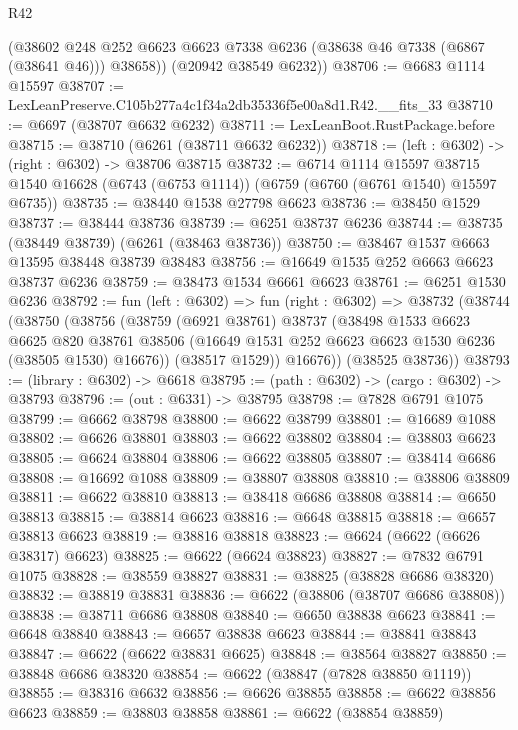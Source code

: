 \begin{lexlean}{R42}
\begin{coremodule}
{        (@38602 @248 @252 @6623 @6623 @7338 @6236 (@38638 @46 @7338 (@6867 (@38641 @46))) @38658))
      (@20942 @38549 @6232))
@38706 := @6683 @1114 @15597
@38707 := LexLeanPreserve.C105b277a4c1f34a2db35336f5e00a8d1.R42.__fits_33
@38710 := @6697 (@38707 @6632 @6232)
@38711 := LexLeanBoot.RustPackage.before
@38715 := @38710 (@6261 (@38711 @6632 @6232))
@38718 := (left : @6302) -> (right : @6302) -> @38706 @38715
@38732 := @6714
    @1114
    @15597
    @38715
    @1540
    @16628
    (@6743 (@6753 @1114))
    (@6759 (@6760 (@6761 @1540) @15597 @6735))
@38735 := @38440 @1538 @27798 @6623
@38736 := @38450 @1529
@38737 := @38444 @38736
@38739 := @6251 @38737 @6236
@38744 := @38735 (@38449 @38739) (@6261 (@38463 @38736))
@38750 := @38467 @1537 @6663 @13595 @38448 @38739 @38483
@38756 := @16649 @1535 @252 @6663 @6623 @38737 @6236
@38759 := @38473 @1534 @6661 @6623
@38761 := @6251 @1530 @6236
@38792 := fun (left : @6302) =>
  fun (right : @6302) =>
  @38732
    (@38744
      (@38750
        (@38756
          (@38759
            (@6921 @38761)
            @38737
            (@38498
              @1533
              @6623
              @6625
              @820
              @38761
              @38506
              (@16649 @1531 @252 @6623 @6623 @1530 @6236 (@38505 @1530) @16676))
            (@38517 @1529))
          @16676))
      (@38525 @38736))
@38793 := (library : @6302) -> @6618
@38795 := (path : @6302) -> (cargo : @6302) -> @38793
@38796 := (out : @6331) -> @38795
@38798 := @7828 @6791 @1075
@38799 := @6662 @38798
@38800 := @6622 @38799
@38801 := @16689 @1088
@38802 := @6626 @38801
@38803 := @6622 @38802
@38804 := @38803 @6623
@38805 := @6624 @38804
@38806 := @6622 @38805
@38807 := @38414 @6686
@38808 := @16692 @1088
@38809 := @38807 @38808
@38810 := @38806 @38809
@38811 := @6622 @38810
@38813 := @38418 @6686 @38808
@38814 := @6650 @38813
@38815 := @38814 @6623
@38816 := @6648 @38815
@38818 := @6657 @38813 @6623
@38819 := @38816 @38818
@38823 := @6624 (@6622 (@6626 @38317) @6623)
@38825 := @6622 (@6624 @38823)
@38827 := @7832 @6791 @1075
@38828 := @38559 @38827
@38831 := @38825 (@38828 @6686 @38320)
@38832 := @38819 @38831
@38836 := @6622 (@38806 (@38707 @6686 @38808))
@38838 := @38711 @6686 @38808
@38840 := @6650 @38838 @6623
@38841 := @6648 @38840
@38843 := @6657 @38838 @6623
@38844 := @38841 @38843
@38847 := @6622 (@6622 @38831 @6625)
@38848 := @38564 @38827
@38850 := @38848 @6686 @38320
@38854 := @6622 (@38847 (@7828 @38850 @1119))
@38855 := @38316 @6632
@38856 := @6626 @38855
@38858 := @6622 @38856 @6623
@38859 := @38803 @38858
@38861 := @6622 (@38854 @38859)
}
\end{coremodule}
\end{lexlean}
